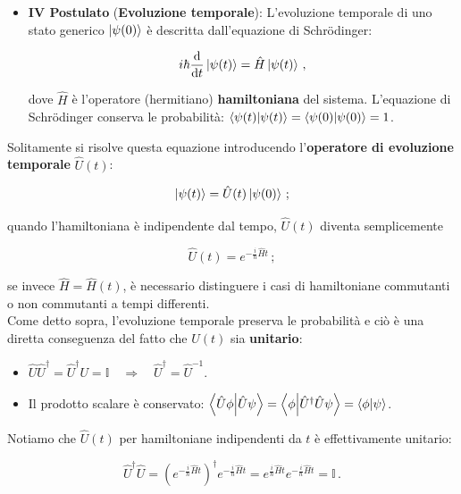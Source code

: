 \begin{itemize}
    \item \textbf{IV Postulato} (\textbf{Evoluzione temporale}): L'evoluzione temporale di uno stato generico $\ket{\psi(0)}$ è descritta dall'equazione di Schrödinger:
    
    \begin{equation*}
        i \hbar \dv{t} \ket{\psi(t)} = \hat H \ket{\psi(t)} \, ,
    \end{equation*}
    
    \noindent dove $\hat{H}$ è l'operatore (hermitiano) \textbf{hamiltoniana} del sistema. L'equazione di Schrödinger conserva le probabilità: $\braket{\psi(t)} = \braket{\psi(0)} = 1$. 
\end{itemize}

\noindent Solitamente si risolve questa equazione introducendo l'\textbf{operatore di evoluzione temporale} $\hat{U}(t)$:

\begin{equation*}
    \ket{\psi(t)} = \hat{U}(t) \ket{\psi(0)} \, ;
\end{equation*}

\noindent quando l'hamiltoniana è indipendente dal tempo, $\hat{U}(t)$ diventa semplicemente

\begin{equation*}
    \hat{U} (t) = e^{-\frac{i}{\hbar} \hat H t} \, ;
\end{equation*}

\noindent se invece $\hat H = \hat H(t)$, è necessario distinguere i casi di hamiltoniane commutanti o non commutanti a tempi differenti.\\
\noindent Come detto sopra, l'evoluzione temporale preserva le probabilità e ciò è una diretta conseguenza del fatto che $\hat{U}(t)$ sia \textbf{unitario}: 
\begin{itemize}
    \item $\hat U \hat U^\dagger = \hat U^\dagger U = \mathbb{I} \quad \Rightarrow \quad \hat{U}^\dagger = \hat{U}^{-1}$.
    \item Il prodotto scalare è conservato: $\braket{\hat U\phi}{\hat U\psi} = \braket{\phi}{\hat U^\dagger \hat U\psi} = \braket{\phi}{\psi}$. 
\end{itemize}
\noindent Notiamo che $\hat{U}(t)$ per hamiltoniane indipendenti da $t$ è effettivamente unitario:

\begin{equation*}
    \hat U^\dagger \hat U = \left( e^{-\frac{i}{\hbar} \hat H t} \right)^\dagger e^{-\frac{i}{\hbar} \hat H t} = e^{\frac{i}{\hbar} \hat H t} e^{-\frac{i}{\hbar} \hat H t} = \mathbb{I} \, .
\end{equation*}

